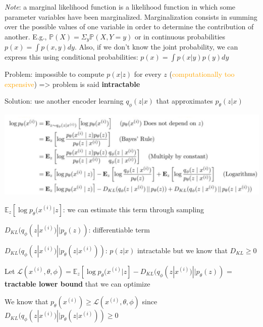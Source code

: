 \textit{Note}: a marginal likelihood function is a likelihood function in which some parameter variables have been marginalized. Marginalization consists in summing over the possible values of one variable in order to determine the contribution of another. E.g., $\mathbb{P}(X)=\Sigma_y \mathbb{P}(X, Y=y)$ or in continuous probabilities $p(x)=\int p(x, y) dy$. Also, if we don't know the joint probability, we can express this using conditional probabilities: $p(x)=\int p(x | y) p(y) dy$

\vspace{5mm}

Problem: impossible to compute $p(x|z)$ for every $z$ (\textcolor{orange}{computationally too expensive}) => problem is said \textbf{intractable}

\vspace{5mm}

Solution: use another encoder learning $q_\phi (z|x)$ that approximates $p_\theta(z | x)$

\begin{center}
\includegraphics[scale=0.4]{log-likelihood-VAE.png}
\end{center}

\vspace{5mm}

$\mathbb{E}_z[\log p_\theta (x^{(i)} | z]$: we can estimate this term through sampling

$D_{KL}(q_\phi(z | x^{(i)}) || p_\theta(z))$: differentiable term

$D_{KL}(q_\phi(z | x^{(i)}) || p_\theta(z | x^{(i)}))$: $p(z|x)$ intractable but we know that $D_{KL} \geq 0$

\vspace{5mm}

Let $\mathcal{L}(x^{(i)}, \theta, \phi) = \mathbb{E}_z[\log p_\theta (x^{(i)} | z] - D_{KL}(q_\phi(z | x^{(i)}) || p_\theta(z))$ = \textbf{tractable lower bound} that we can optimize

\vspace{5mm}

We know that $p_\theta (x^{(i)}) \geq \mathcal{L}(x^{(i)}, \theta, \phi)$ since $D_{KL}(q_\phi(z | x^{(i)}) || p_\theta(z | x^{(i)})) \geq 0$


